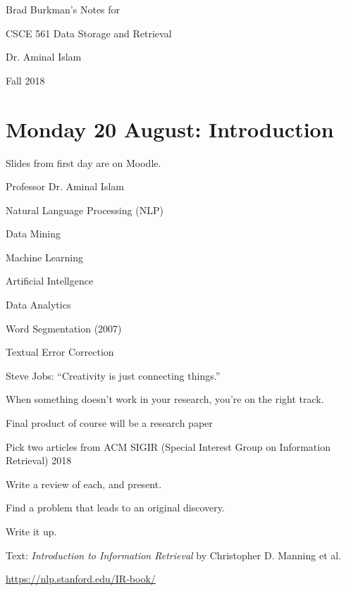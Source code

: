 \documentclass[11pt]{article}
\begin{document}
\setlength{\parindent}{0pt}
\begin{spacing}{1.2}

%
%

Brad Burkman's Notes for

\qquad CSCE 561 Data Storage and Retrieval

\qquad Dr. Aminal Islam

\qquad Fall 2018

\vskip 12pt

\tableofcontents

\section{Monday 20 August:  Introduction}

Slides from first day are on Moodle.  

\vskip 12pt

Professor Dr. Aminal Islam

\qquad Natural Language Processing (NLP)

\qquad Data Mining

\qquad Machine Learning 

\qquad Artificial Intellgence

\qquad Data Analytics

\qquad Word Segmentation (2007)

\qquad Textual Error Correction

\vskip 12pt

Steve Jobs:  ``Creativity is just connecting things.''

\qquad

When something doesn't work in your research, you're on the right track.  

\vskip 12pt

Final product of course will be a research paper

\qquad Pick two articles from ACM SIGIR (Special Interest Group on Information Retrieval) 2018

\qquad Write a review of each, and present.

\qquad Find a problem that leads to an original discovery.  

\qquad Write it up.

\vskip 12pt

Text:  {\it Introduction to Information Retrieval} by Christopher D. Manning et al. 

\url{https://nlp.stanford.edu/IR-book/}



\end{spacing}
\end{document}
